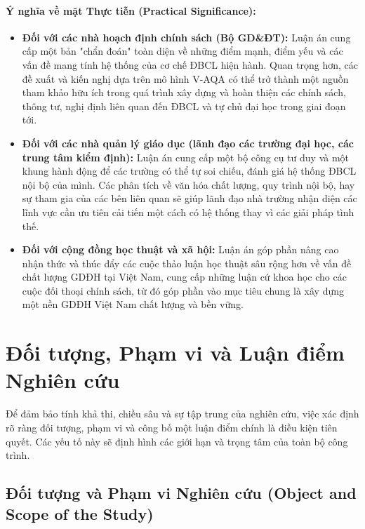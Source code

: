 \documentclass[12pt, a4paper, openany]{report}
\begin{document}
\paragraph{Ý nghĩa về mặt Thực tiễn (Practical Significance):}
\begin{itemize}
    \item \textbf{Đối với các nhà hoạch định chính sách (Bộ GD\&ĐT):} Luận án cung cấp một bản "chẩn đoán" toàn diện về những điểm mạnh, điểm yếu và các vấn đề mang tính hệ thống của cơ chế ĐBCL hiện hành. Quan trọng hơn, các đề xuất và kiến nghị dựa trên mô hình V-AQA có thể trở thành một nguồn tham khảo hữu ích trong quá trình xây dựng và hoàn thiện các chính sách, thông tư, nghị định liên quan đến ĐBCL và tự chủ đại học trong giai đoạn tới.
    \item \textbf{Đối với các nhà quản lý giáo dục (lãnh đạo các trường đại học, các trung tâm kiểm định):} Luận án cung cấp một bộ công cụ tư duy và một khung hành động để các trường có thể tự soi chiếu, đánh giá hệ thống ĐBCL nội bộ của mình. Các phân tích về văn hóa chất lượng, quy trình nội bộ, hay sự tham gia của các bên liên quan sẽ giúp lãnh đạo nhà trường nhận diện các lĩnh vực cần ưu tiên cải tiến một cách có hệ thống thay vì các giải pháp tình thế.
    \item \textbf{Đối với cộng đồng học thuật và xã hội:} Luận án góp phần nâng cao nhận thức và thúc đẩy các cuộc thảo luận học thuật sâu rộng hơn về vấn đề chất lượng GDĐH tại Việt Nam, cung cấp những luận cứ khoa học cho các cuộc đối thoại chính sách, từ đó góp phần vào mục tiêu chung là xây dựng một nền GDĐH Việt Nam chất lượng và bền vững.
\end{itemize}




\section{Đối tượng, Phạm vi và Luận điểm Nghiên cứu}
\label{sec:doi_tuong_pham_vi_luandiem}

Để đảm bảo tính khả thi, chiều sâu và sự tập trung của nghiên cứu, việc xác định rõ ràng đối tượng, phạm vi và công bố một luận điểm chính là điều kiện tiên quyết. Các yếu tố này sẽ định hình các giới hạn và trọng tâm của toàn bộ công trình.

\subsection{Đối tượng và Phạm vi Nghiên cứu (Object and Scope of the Study)}
\label{subsec:doi_tuong_pham_vi}
\end{document}
